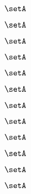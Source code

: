 \begin{forslides}
    \begin{equation}
        \label{eq:slides-translation-151}
        \setA
    \end{equation}

    \begin{equation}
        \label{eq:slides-translation-152}
        \setA
    \end{equation}

    \begin{equation}
        \label{eq:slides-translation-153}
        \setA
    \end{equation}

    \begin{equation}
        \label{eq:slides-translation-154}
        \setA
    \end{equation}

    \begin{equation}
        \label{eq:slides-translation-155}
        \setA
    \end{equation}

    \begin{equation}
        \label{eq:slides-translation-156}
        \setA
    \end{equation}

    \begin{equation}
        \label{eq:slides-translation-157}
        \setA
    \end{equation}

    \begin{equation}
        \label{eq:slides-translation-158}
        \setA
    \end{equation}

    \begin{equation}
        \label{eq:slides-translation-159}
        \setA
    \end{equation}

    \begin{equation}
        \label{eq:slides-translation-160}
        \setA
    \end{equation}

    \begin{equation}
        \label{eq:slides-translation-161}
        \setA
    \end{equation}

    \begin{equation}
        \label{eq:slides-translation-162}
        \setA
    \end{equation}


\end{forslides}
